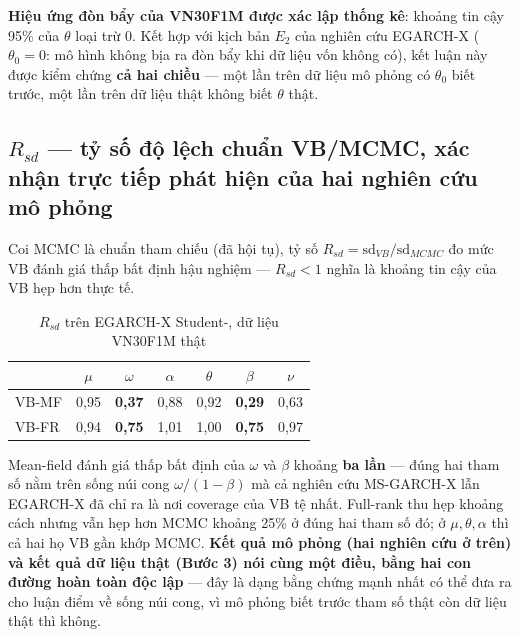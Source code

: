 \documentclass[11pt,a4paper]{article}
\begin{document}
\textbf{Hiệu ứng đòn bẩy của VN30F1M được xác lập thống kê}: khoảng tin cậy
95\% của $\theta$ loại trừ 0. Kết hợp với kịch bản $E_2$ của nghiên cứu EGARCH-X ($\theta_0=0$: mô hình
không bịa ra đòn bẩy khi dữ liệu vốn không có), kết luận này được kiểm chứng
\textbf{cả hai chiều} --- một lần trên dữ liệu mô phỏng có $\theta_0$ biết
trước, một lần trên dữ liệu thật không biết $\theta$ thật.

\subsection*{$R_{sd}$ --- tỷ số độ lệch chuẩn VB/MCMC, xác nhận trực tiếp phát hiện của hai nghiên cứu mô phỏng}

Coi MCMC là chuẩn tham chiếu (đã hội tụ), tỷ số $R_{sd}=\mathrm{sd}_{VB}/\mathrm{sd}_{MCMC}$
đo mức VB đánh giá thấp bất định hậu nghiệm --- $R_{sd}<1$ nghĩa là khoảng tin
cậy của VB hẹp hơn thực tế.

\begin{table}[H]\centering\small
\caption{$R_{sd}$ trên EGARCH-X Student-, dữ liệu VN30F1M thật}
\begin{tabularx}{\textwidth}{l C C C C C C}
\toprule
 & $\mu$ & $\omega$ & $\alpha$ & $\theta$ & $\beta$ & $\nu$ \\
\midrule
VB-MF & 0{,}95 & \textbf{0{,}37} & 0{,}88 & 0{,}92 & \textbf{0{,}29} & 0{,}63 \\
VB-FR & 0{,}94 & \textbf{0{,}75} & 1{,}01 & 1{,}00 & \textbf{0{,}75} & 0{,}97 \\
\bottomrule
\end{tabularx}
\end{table}

Mean-field đánh giá thấp bất định của $\omega$ và $\beta$ khoảng \textbf{ba
lần} --- đúng hai tham số nằm trên sống núi cong $\omega/(1-\beta)$ mà cả
nghiên cứu MS-GARCH-X lẫn EGARCH-X đã chỉ ra là nơi coverage của VB tệ nhất.
Full-rank thu hẹp khoảng cách nhưng vẫn hẹp hơn MCMC khoảng 25\% ở đúng hai
tham số đó; ở $\mu,\theta,\alpha$ thì cả hai họ VB gần khớp MCMC. \textbf{Kết
quả mô phỏng (hai nghiên cứu ở trên) và kết quả dữ liệu thật (Bước 3) nói
cùng một điều, bằng hai con đường hoàn toàn độc lập} --- đây là dạng bằng
chứng mạnh nhất có thể đưa ra cho luận điểm về sống núi cong, vì mô phỏng
biết trước tham số thật còn dữ liệu thật thì không.
\end{document}
